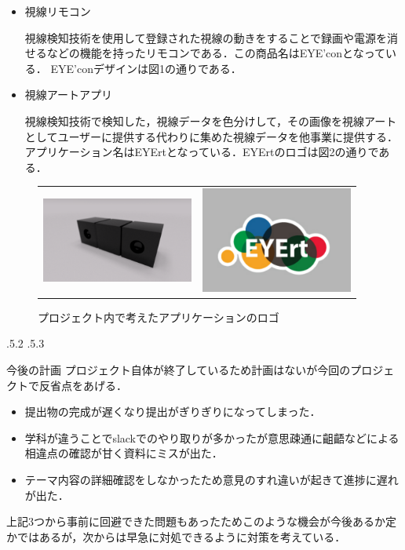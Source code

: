 \documentclass[uplatex]{jsarticle}
\makeatletter
\renewcommand{\section}{%
    \if@slide\clearpage\fi
    \@startsection{section}{1}{\z@}%
    {\Cvs \@plus.5\Cdp \@minus.2\Cdp}%
    {.5\Cvs \@plus.3\Cdp}%
    {\normalfont\raggedright}}
\makeatother
\begin{document}
\begin{itemize}
\item 視線リモコン

視線検知技術を使用して登録された視線の動きをすることで録画や電源を消せるなどの機能を持ったリモコンである．この商品名はEYE’conとなっている．
EYE’conデザインは図1の通りである．


\item 視線アートアプリ

視線検知技術で検知した，視線データを色分けして，その画像を視線アートとしてユーザーに提供する代わりに集めた視線データを他事業に提供する．アプリケーション名はEYErtとなっている．EYErtのロゴは図2の通りである．

\end{itemize}

\begin{center}
\begin{figure}[htbp]
\begin{tabular}{cc}
\begin{minipage}[t]{0.5\hsize}
 \centering
 \includegraphics[width=5cm,clip]{design.pdf}
 \caption{プロジェクト内で考えたハードのデザイン}
 \label{サンプル図}
\end{minipage} &
\begin{minipage}[t]{0.5\hsize}
 \centering
 \includegraphics[width=5cm,clip]{f.pdf}
 \caption{プロジェクト内で考えたアプリケーションのロゴ}
 \label{サンプル図}
\end{minipage}
\end{tabular}
\end{figure}

\end{center}
\section{今後の計画}
プロジェクト自体が終了しているため計画はないが今回のプロジェクトで反省点をあげる．
\begin{itemize}
\item 提出物の完成が遅くなり提出がぎりぎりになってしまった．
\item 学科が違うことでslackでのやり取りが多かったが意思疎通に齟齬などによる相違点の確認が甘く資料にミスが出た．
\item テーマ内容の詳細確認をしなかったため意見のすれ違いが起きて進捗に遅れが出た．
\end{itemize}

上記3つから事前に回避できた問題もあったためこのような機会が今後あるか定かではあるが，次からは早急に対処できるように対策を考えている．




\end{document}

